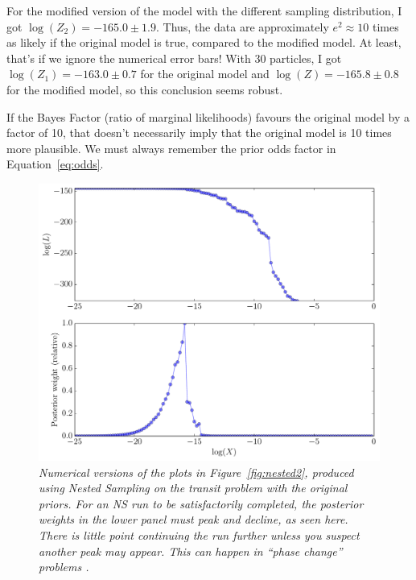 For the modified version of the model with the different sampling distribution,
I got $\log(Z_2) = -165.0 \pm 1.9$. Thus, the data are approximately
$e^2 \approx 10$ times as likely if the original model is true, compared to
the modified model. At least, that's if we ignore the numerical error bars!
With 30 particles, I got $\log(Z_1) = -163.0 \pm 0.7$ for the original model and
$\log(Z) = -165.8 \pm 0.8$ for the modified model, so this conclusion seems
robust.

If the Bayes Factor (ratio of marginal likelihoods) favours the original model
by a factor of 10, that doesn't necessarily imply that the original model is
10 times more plausible. We must always remember the prior odds factor in
Equation~\ref{eq:odds}.


\begin{figure}
\begin{center}
\includegraphics[scale=0.45]{ns_output.pdf}
\caption{\it Numerical versions of the plots in Figure~\ref{fig:nested2},
produced using Nested Sampling on the transit problem with the original
priors. For an NS run to be satisfactorily completed, the posterior weights
in the lower panel must peak and decline, as seen here. There is little point
continuing the run further unless you suspect another peak may appear. This
can happen in ``phase change'' problems \citep{skilling}.\label{fig:ns_output}}
\end{center}
\end{figure}




